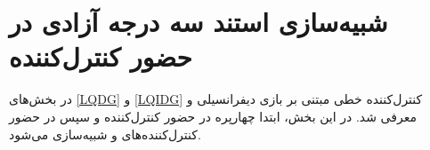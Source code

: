 \section{شبیه‌سازی استند سه درجه آزادی در حضور کنترل‌کننده}\label{MIL}
در بخش‌های
\ref{LQDG}
و
\ref{LQIDG}
کنترل‌کننده خطی مبتنی بر بازی دیفرانسیلی  و  معرفی شد. در این بخش، ابتدا چهارپره در حضور کنترل‌کننده  و سپس در حضور کنترل‌کننده‌های  و  شبیه‌سازی می‌شود.
